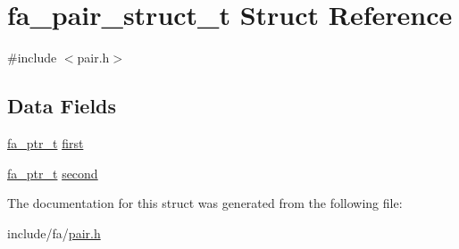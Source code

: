 \hypertarget{structfa__pair__struct__t}{\section{fa\-\_\-pair\-\_\-struct\-\_\-t Struct Reference}
\label{structfa__pair__struct__t}
}


{\ttfamily \#include $<$pair.\-h$>$}

\subsection*{Data Fields}
\begin{DoxyCompactItemize}
\item 
\hyperlink{group___fa_ga915ddeae99ad7568b273d2b876425197}{fa\-\_\-ptr\-\_\-t} \hyperlink{group___fa_ga0bb4f184974c0b92f618d0378ff6456a}{first}
\item 
\hyperlink{group___fa_ga915ddeae99ad7568b273d2b876425197}{fa\-\_\-ptr\-\_\-t} \hyperlink{group___fa_ga64922ec78ee05bf65c39ed8004957977}{second}
\end{DoxyCompactItemize}


The documentation for this struct was generated from the following file\-:\begin{DoxyCompactItemize}
\item 
include/fa/\hyperlink{pair_8h}{pair.\-h}\end{DoxyCompactItemize}
